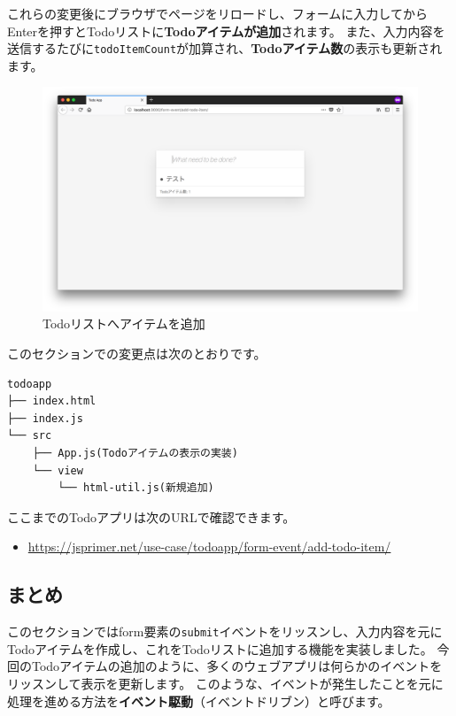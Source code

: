 これらの変更後にブラウザでページをリロードし、フォームに入力してからEnterを押すとTodoリストに\textbf{Todoアイテムが追加}されます。
また、入力内容を送信するたびに\texttt{todoItemCount}が加算され、\textbf{Todoアイテム数}の表示も更新されます。

\begin{figure}
\centering
\includegraphics[width=120mm]{./fig/add-todo-item.png}
\caption{Todoリストへアイテムを追加}
\end{figure}

このセクションでの変更点は次のとおりです。

\begin{lstlisting}
todoapp
├── index.html
├── index.js
└── src
    ├── App.js(Todoアイテムの表示の実装)
    └── view
        └── html-util.js(新規追加)
\end{lstlisting}

ここまでのTodoアプリは次のURLで確認できます。

\begin{itemize}
\item
  \url{https://jsprimer.net/use-case/todoapp/form-event/add-todo-item/}
\end{itemize}

\hypertarget{conclusion}{%
\subsection{まとめ}\label{conclusion}}

このセクションではform要素の\texttt{submit}イベントをリッスンし、入力内容を元にTodoアイテムを作成し、これをTodoリストに追加する機能を実装しました。
今回のTodoアイテムの追加のように、多くのウェブアプリは何らかのイベントをリッスンして表示を更新します。
このような、イベントが発生したことを元に処理を進める方法を\textbf{イベント駆動}（イベントドリブン）と呼びます。

